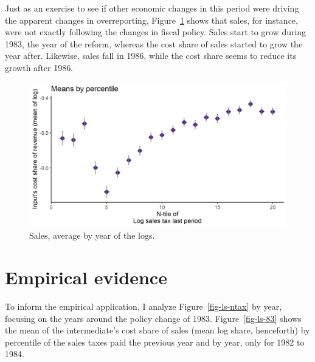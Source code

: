 \documentclass[
  12pt]{article}
\theoremstyle{definition}
\theoremstyle{remark}
\begin{document}
Just as an exercise to see if other economic changes in this period were
driving the apparent changes in overreporting, Figure~\ref{fig-logsales}
shows that sales, for instance, were not exactly following the changes
in fiscal policy. Sales start to grow during 1983, the year of the
reform, whereas the cost share of sales started to grow the year after.
Likewise, sales fall in 1986, while the cost share seems to reduce its
growth after 1986.

\begin{figure}

{\centering \includegraphics[width=1\textwidth,height=\textheight]{../Results/Figures/Colombia/select_disc_lag_log_sales_tax_20.png}

}

\caption{\label{fig-logsales}Sales, average by year of the logs.}

\end{figure}

\hypertarget{empirical-evidence}{%
\section{Empirical evidence}\label{empirical-evidence}}

To inform the empirical application, I analyze Figure~\ref{fig-ls-ntax}
by year, focusing on the years around the policy change of 1983.
Figure~\ref{fig-ls-83} shows the mean of the intermediate's cost share
of sales (mean log share, henceforth) by percentile of the sales taxes
paid the previous year and by year, only for 1982 to 1984.
\end{document}
